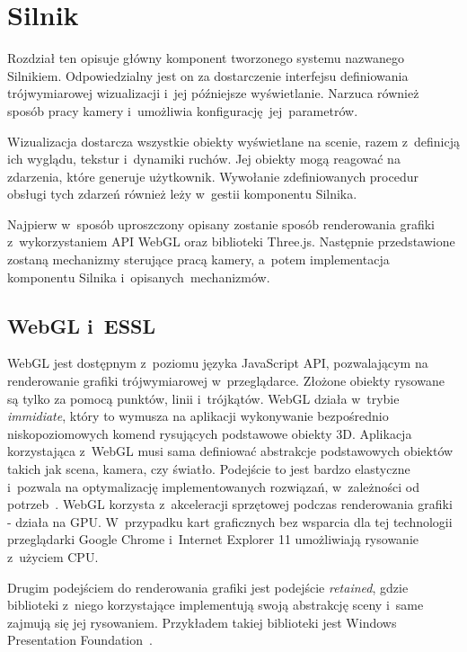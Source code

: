 \chapter{Silnik}

Rozdział ten opisuje główny komponent tworzonego systemu nazwanego Silnikiem. Odpowiedzialny jest on za dostarczenie interfejsu definiowania trójwymiarowej wizualizacji i~jej późniejsze wyświetlanie. Narzuca również sposób pracy kamery i~umożliwia \mbox{konfigurację jej parametrów}.

Wizualizacja dostarcza wszystkie obiekty wyświetlane na scenie, razem z~definicją ich wyglądu, tekstur i~dynamiki ruchów. Jej obiekty mogą reagować na zdarzenia, które generuje użytkownik. Wywołanie zdefiniowanych procedur obsługi tych zdarzeń również leży w~gestii komponentu Silnika.

Najpierw w~sposób uproszczony opisany zostanie sposób renderowania grafiki z~wykorzystaniem API WebGL oraz biblioteki Three.js. Następnie przedstawione zostaną mechanizmy sterujące pracą kamery, a~potem implementacja komponentu Silnika \mbox{i~opisanych mechanizmów.}

\section{WebGL i~ESSL}

WebGL jest dostępnym z~poziomu języka JavaScript API, pozwalającym na renderowanie grafiki trójwymiarowej w~przeglądarce. Złożone obiekty rysowane są tylko za pomocą punktów, linii i~trójkątów.  WebGL działa w~trybie \textit{immidiate}, który to wymusza na aplikacji wykonywanie bezpośrednio niskopoziomowych komend rysujących podstawowe obiekty 3D. Aplikacja korzystająca z~WebGL musi sama definiować abstrakcje podstawowych obiektów takich jak scena, kamera, czy światło. Podejście to jest bardzo elastyczne i~pozwala na optymalizację implementowanych rozwiązań, w~zależności od potrzeb~\cite[Rozdział 1]{RealTime3DGraphics}. WebGL korzysta z~akceleracji sprzętowej podczas renderowania grafiki - działa na GPU. W~przypadku kart graficznych bez wsparcia dla tej technologii przeglądarki Google Chrome i~Internet Explorer 11 umożliwiają rysowanie z~użyciem CPU.

Drugim podejściem do renderowania grafiki jest podejście \textit{retained}, gdzie biblioteki z~niego korzystające implementują swoją abstrakcję sceny i~same zajmują się jej rysowaniem. Przykładem takiej biblioteki jest Windows Presentation Foundation~\cite{WPF}.

